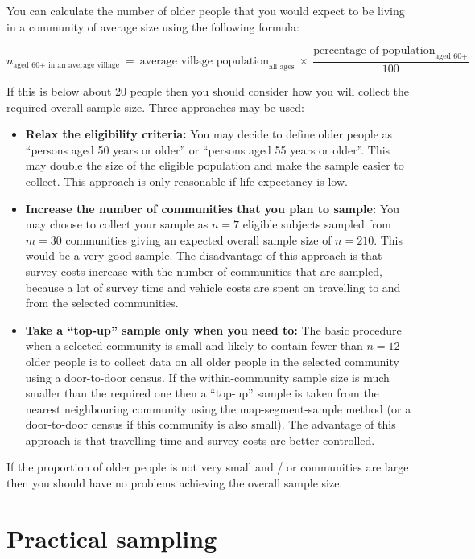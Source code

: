 \documentclass[12pt,a4paper]{book}
\theoremstyle{definition}
\theoremstyle{definition}
\theoremstyle{definition}
\theoremstyle{remark}
\begin{document}
You can calculate the number of older people that you would expect to be
living in a community of average size using the following formula:

\[n_{\text{aged 60+ in an average village}} ~ = ~ \text{average village population}_{\text{all ages}} ~ \times ~ \frac{\text{percentage of population}_{\text{aged 60+}}}{100}\]

If this is below about 20 people then you should consider how you will
collect the required overall sample size. Three approaches may be used:

\begin{itemize}
\item
  \textbf{Relax the eligibility criteria:} You may decide to define
  older people as ``persons aged 50 years or older'' or ``persons aged
  55 years or older''. This may double the size of the eligible
  population and make the sample easier to collect. This approach is
  only reasonable if life-expectancy is low.
\item
  \textbf{Increase the number of communities that you plan to sample:}
  You may choose to collect your sample as \(n = 7\) eligible subjects
  sampled from \(m = 30\) communities giving an expected overall sample
  size of \(n = 210\). This would be a very good sample. The
  disadvantage of this approach is that survey costs increase with the
  number of communities that are sampled, because a lot of survey time
  and vehicle costs are spent on travelling to and from the selected
  communities.
\item
  \textbf{Take a ``top-up'' sample only when you need to:} The basic
  procedure when a selected community is small and likely to contain
  fewer than \(n = 12\) older people is to collect data on all older
  people in the selected community using a door-to-door census. If the
  within-community sample size is much smaller than the required one
  then a ``top-up'' sample is taken from the nearest neighbouring
  community using the map-segment-sample method (or a door-to-door
  census if this community is also small). The advantage of this
  approach is that travelling time and survey costs are better
  controlled.
\end{itemize}

If the proportion of older people is not very small and / or communities
are large then you should have no problems achieving the overall sample
size.

\hypertarget{practical-sampling}{%
\section{Practical sampling}\label{practical-sampling}}
\end{document}
